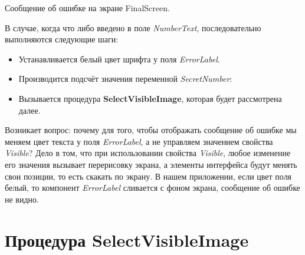 \begin{enumerate}
\begin{marginfigure}[-2em]
      \caption[Сообщение об ошибке на экране FinalScreen.]{Сообщение об ошибке на экране FinalScreen.}
    \label{fig:block:final:screen:error}
  \end{marginfigure}
  В случае, когда что либо введено в поле \textit{NumberText}, последовательно выполняются следующие шаги:
  \begin{itemize}
    \item Устанавливается белый цвет шрифта у поля \textit{ErrorLabel}.
    \item Производится подсчёт значения переменной \textit{SecretNumber}:
    \item Вызывается процедура \textbf{SelectVisibleImage}, которая будет рассмотрена далее.
  \end{itemize}
\end{enumerate}
Возникает вопрос: почему для того, чтобы отображать сообщение об ошибке мы меняем цвет текста у поля \textit{ErrorLabel}, а не управляем значением свойства \textit{Visible}? 
Дело в том, что при использовании свойства \textit{Visible}, любое изменение его значения вызывает перерисовку экрана, а элементы интерфейса будут менять свои позиции, то есть скакать по экрану.
В нашем приложении, если цвет поля белый, то компонент \textit{ErrorLabel} сливается с фоном экрана, сообщение об ошибке не видно.
\section{Процедура SelectVisibleImage}

